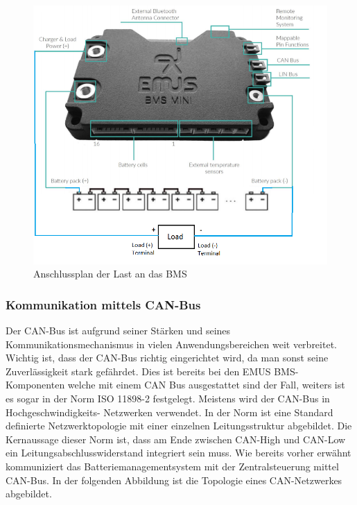 \begin{figure}[H]
	\begin{center}
		\includegraphics[scale=0.7]{figures/Akku/SystemStrukturBMSLast.png}
		\caption{Anschlussplan der Last an das BMS\cite{AnschlussplanLast}}
		\label{fig: Anschlussplan der Last an das BMS}
	\end{center}
\end{figure}
\newpage

\subsubsection{Kommunikation mittels CAN-Bus}

Der CAN-Bus ist aufgrund seiner Stärken und seines Kommunikationsmechanismus in vielen Anwendungsbereichen weit verbreitet. Wichtig ist, dass der CAN-Bus richtig eingerichtet wird, da man sonst seine Zuverlässigkeit stark gefährdet. Dies ist bereits bei den EMUS BMS-Komponenten welche mit einem CAN Bus ausgestattet sind der Fall, weiters ist es sogar in der Norm ISO 11898-2 festgelegt. Meistens wird der CAN-Bus in Hochgeschwindigkeits- Netzwerken verwendet. In der Norm ist eine Standard definierte Netzwerktopologie mit einer einzelnen Leitungsstruktur abgebildet. Die Kernaussage dieser Norm ist, dass am Ende zwischen CAN-High und CAN-Low ein Leitungsabschlusswiderstand integriert sein muss. Wie bereits vorher erwähnt kommuniziert das Batteriemanagementsystem mit der Zentralsteuerung mittel CAN-Bus. In der folgenden Abbildung ist die Topologie eines CAN-Netzwerkes abgebildet.

